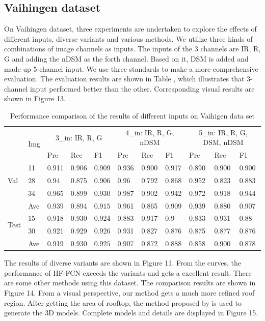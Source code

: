 \subsection{Vaihingen dataset}
On Vaihingen dataset, three experiments are undertaken to explore the effects of different inputs, diverse variants and various methods. We utilize  three kinds of combinations of image channels as inputs. The inputs of the 3 channels are IR, R, G and adding the nDSM as the forth channel. Based on it, DSM is added and made up 5-channel input. We use three standards to make a more comprehensive evaluation. The evaluation results are shown in Table , which illustrates that 3-channel input performed better than the other. Corresponding visual results are shown in Figure 13.\par
\begin{table}[htbp]
\caption {Performance comparison of the results of different inputs on Vaihigen data set}
\centering
\begin{tabular}{p{1.1cm}<{\centering}|p{1.1cm}<{\centering}|p{1.1cm}<{\centering}|p{1.1cm}<{\centering}|p{1.1cm}<{\centering}|p{1.1cm}<{\centering}|p{1.1cm}<{\centering}|p{1.1cm}<{\centering}|p{1.1cm}<{\centering}|p{1.1cm}<{\centering}|p{1.1cm}<{\centering}}
\hline
&\multirow{2}{*}{Img}&\multicolumn{3}{c}{3\_in: IR, R, G} &\multicolumn{3}{|c|}{4\_in: IR, R, G, nDSM}&\multicolumn{3}{c}{5\_in: IR, R, G, DSM, nDSM}\\
\cline{3-11}
&& Pre &Rec & F1 &Pre &Rec &F1&Pre &Rec &F1\\
\hline
\multirow{3}{*}{Val}&11&0.911&0.906&0.909&0.936&0.900&0.917&0.890&0.900&0.900\\
&28&0.94&0.875&0.906&0.96&0.792&0.868&0.952&0.823&0.883\\
&34&0.965&0.899&0.930&0.987&0.902&0.942&0.972&0.918&0.944\\
&Ave&0.939&0.894&$\bm{0.915}$&0.961&0.865&0.909&0.939&0.880&0.907\\
\hline
\multirow{2}{*}{Test}&15&0.918&0.930&0.924&0.883&0.917&0.9&0.833&0.931&0.88\\
&30&0.921&0.929&0.926&0.931&0.827&0.876&0.875&0.877&0.876\\
&Ave&0.919&0.930&$\bm{0.925}$&0.907&0.872&0.888&0.858&0.900&0.878\\
\hline
\end{tabular}
\end{table}

\setlength{\parindent}{2ex}The results of diverse variants are shown in Figure 11. From the curves, the performance of HF-FCN exceeds the variants and gets a excellent result. There are some other methods using this dataset. The comparison results are shown in Figure 14. From a visual perspective, our method gets a much more refined roof region. After getting the area of rooftop, the method proposed by \cite{IEEEexample:zhou20112} is used to generate the 3D models. Complete models and details are displayed in Figure 15.


